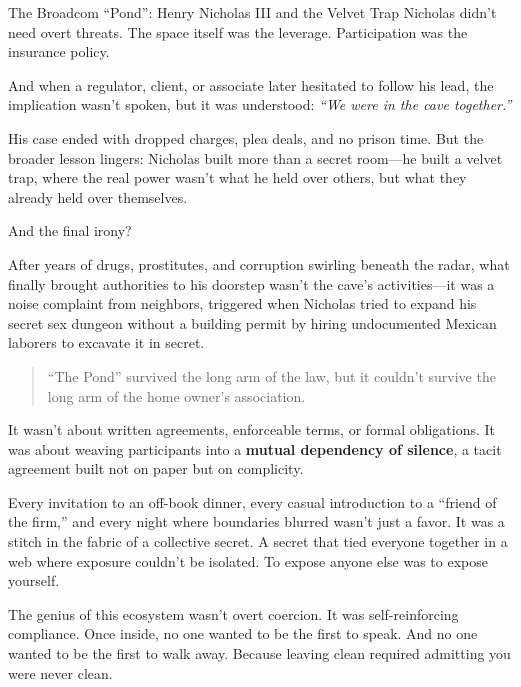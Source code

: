 \begin{HistoricalSidebar}{The Broadcom ``Pond'': Henry Nicholas III and the Velvet Trap}
  Nicholas didn’t need overt threats. The space itself was the leverage. Participation was the insurance policy.  

  \medskip
  
  And when a regulator, client, or associate later hesitated to follow his lead, the implication wasn’t spoken, but it 
  was understood:  \textit{“We were in the cave together.”}

  \medskip
  
  His case ended with dropped charges, plea deals, and no prison time. But the broader lesson lingers: Nicholas built 
  more than a secret room—he built a velvet trap, where the real power wasn’t what he held over others, but what they 
  already held over themselves.

  \medskip

  And the final irony?
  
  \medskip

  After years of drugs, prostitutes, and corruption swirling beneath the radar, what finally brought authorities to his 
  doorstep wasn’t the cave’s activities—it was a noise complaint from neighbors, triggered when Nicholas tried to expand 
  his secret sex dungeon without a building permit by hiring undocumented Mexican laborers to excavate it in secret.

  \begin{quote}
  ``The Pond'' survived the long arm of the law, but it couldn’t survive the long arm of the home owner's association.
  \end{quote}

\end{HistoricalSidebar}

\medskip

It wasn’t about written agreements, enforceable terms, or formal obligations. It was about weaving participants into a 
\textbf{mutual dependency of silence}, a tacit agreement built not on paper but on complicity.

Every invitation to an off-book dinner, every casual introduction to a “friend of the firm,” and every night where boundaries 
blurred wasn’t just a favor. It was a stitch in the fabric of a collective secret. A secret that tied everyone 
together in a web where exposure couldn’t be isolated. To expose anyone else was to expose yourself.

The genius of this ecosystem wasn’t overt coercion. It was self-reinforcing compliance. Once inside, no one wanted to 
be the first to speak. And no one wanted to be the first to walk away. Because leaving clean required admitting you were 
never clean.

